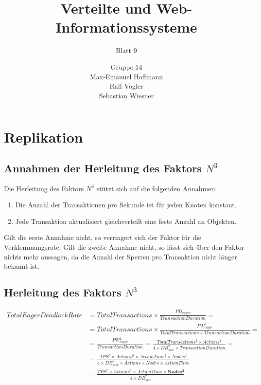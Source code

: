 \documentclass[11pt,a4paper]{scrartcl}
\begin{document}
\author{Gruppe 14\\Max-Emanuel Hoffmann\\Ralf Vogler\\Sebastian Wiesner}
\title{Verteilte und Web-Informationssysteme}
\subtitle{Blatt 9}

\maketitle

\section{Replikation}

\subsection{Annahmen der Herleitung des Faktors $N^3$}

Die Herleitung des Faktors $N^3$ stützt sich auf die folgenden Annahmen:

\begin{enumerate}
\item Die Anzahl der Transaktionen pro Sekunde ist für jeden Knoten konstant.
\item Jede Transaktion aktualisiert gleichverteilt eine feste Anzahl an Objekten.
\end{enumerate}

Gilt die erste Annahme nicht, so verringert sich der Faktor für die Verklemmungsrate.  Gilt die zweite Annahme nicht, so lässt sich über den Faktor nichts mehr aussagen, da die Anzahl der Sperren pro Transaktion nicht länger bekannt ist.

\subsection{Herleitung des Faktors $N^3$}

\begin{align*}
TotalEagerDeadlockRate &= TotalTransactions \times \frac{PD_{eager}}{TransactionDuration} = \\
&= TotalTransactions \times \frac{PW_{eager}^2}{TotalTransactions \times TransactionDuration} = \\
&= \frac{PW_{eager}^2}{TransactionDuration} = \frac{TotalTransactions^2 \times Actions^4}{4 \times DB_{size}^2 \times TransactionDuration} = \\
&= \frac{TPS^2 \times Actions^6 \times ActionTime^2 \times Nodes^4}{4 \times DB_{size}^2 \times Actions \times Nodes \times ActionTime} \\
&= \frac{TPS^2 \times Actions^5 \times ActionTime \times \mathbf{Nodes^3}}{4 \times DB_{size}^2}
\end{align*}
\end{document}
